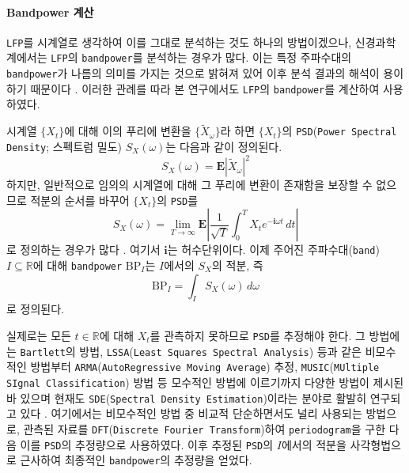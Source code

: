 \documentclass[11pt,onecolumn,twoside,a4size]{gsag3jnl}
\begin{document}
\paragraph{Bandpower 계산}

\texttt{LFP}를 시계열로 생각하여 이를 그대로 분석하는 것도 하나의 방법이겠으나, 신경과학계에서는 \texttt{LFP}의 \texttt{bandpower}를 분석하는 경우가 많다. 이는 특정 주파수대의 \texttt{bandpower}가 나름의 의미를 가지는 것으로 밝혀져 있어 이후 분석 결과의 해석이 용이하기 때문이다 \texttt{\citep{subha2010eeg}}. 이러한 관례를 따라 본 연구에서도 \texttt{LFP}의 \texttt{bandpower}를 계산하여 사용하였다.

시계열 $\{X_t\}$에 대해 이의 푸리에 변환을 $\{\widetilde{X}_\omega\}$라 하면 $\{X_t\}$의 \texttt{PSD}(\texttt{Power Spectral Density}; 스펙트럼 밀도) $S_X(\omega)$는 다음과 같이 정의된다.
\begin{equation}
  S_X(\omega)=\mathbf{E}|\widetilde{X}_\omega|^2
\end{equation}
하지만, 일반적으로 임의의 시계열에 대해 그 푸리에 변환이 존재함을 보장할 수 없으므로 적분의 순서를 바꾸어 $\{X_t\}$의 \texttt{PSD}를
\begin{equation}
  S_X(\omega)=\lim_{T\to\infty}\mathbf{E}\left|\frac{1}{\sqrt{T}}\int_0^TX_te^{-\mathbf{i}\omega t}\,dt\right|
\end{equation}
로 정의하는 경우가 많다 \texttt{\citep{miller2012probability}}. 여기서 $\mathbf{i}$는 허수단위이다. 이제 주어진 주파수대(\texttt{band}) $I\subseteq\mathbb{R}$에 대해 \texttt{bandpower} $\mathrm{BP}_I$는 $I$에서의 $S_X$의 적분, 즉
\begin{equation}
  \mathrm{BP}_I=\int_IS_X(\omega)\,d\omega
\end{equation}
로 정의된다.

실제로는 모든 $t\in\mathbb{R}$에 대해 $X_t$를 관측하지 못하므로 \texttt{PSD}를 추정해야 한다. 그 방법에는 \texttt{Bartlett}의 방법, \texttt{LSSA}(\texttt{Least Squares Spectral Analysis}) 등과 같은 비모수적인 방법부터 \texttt{ARMA}(\texttt{AutoRegressive Moving Average}) 추정, \texttt{MUSIC}(\texttt{MUltiple SIgnal Classification}) 방법 등 모수적인 방법에 이르기까지 다양한 방법이 제시된 바 있으며 현재도 \texttt{SDE}(\texttt{Spectral Density Estimation})이라는 분야로 활발히 연구되고 있다 \texttt{\citep{stoica2005spectral}}. 여기에서는 비모수적인 방법 중 비교적 단순하면서도 널리 사용되는 방법으로, 관측된 자료를 \texttt{DFT}(\texttt{Discrete Fourier Transform})하여 \texttt{periodogram}을 구한 다음 이를 \texttt{PSD}의 추정량으로 사용하였다. 이후 추정된 \texttt{PSD}의 $I$에서의 적분을 사각형법으로 근사하여 최종적인 \texttt{bandpower}의 추정량을 얻었다.
\end{document}
